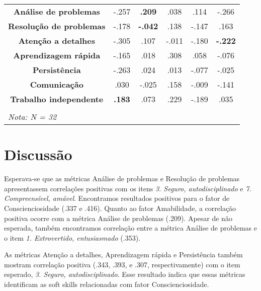 \begin{sidewaystable}[ph!]
\begin{tabular}{lccccc}
		\midrule
    \multicolumn{1}{c}{\textbf{Análise de problemas}} 		& -.257 				 & \textbf{.209}  & .038  & .114  & -.266 				 \\
    \multicolumn{1}{c}{\textbf{Resolução de problemas}} 	& -.178 				 & \textbf{-.042} & .138  & -.147 & .163 				   \\
    \multicolumn{1}{c}{\textbf{Atenção a detalhes}} 			& -.305 				 & .107 				  & -.011 & -.180 & \textbf{-.222} \\
    \multicolumn{1}{c}{\textbf{Aprendizagem rápida}} 			& -.165 				 & .018 				  & .308  & .058  & -.076  				 \\
    \multicolumn{1}{c}{\textbf{Persistência}} 					  & -.263 				 & .024 				  & .013  & -.077 & -.025 				 \\
    \multicolumn{1}{c}{\textbf{Comunicação}} 							& .030 				   & -.025 				  & .158  & -.009 & -.141 				 \\
    \multicolumn{1}{c}{\textbf{Trabalho independente}} 		& \textbf{.183}  & .073 				  & .229  & -.189 & .035 				   \\
    
		\bottomrule
		\multicolumn{1}{l}{\textbf{}} & & & & &  \\
		\multicolumn{1}{l}{\textit{Nota: N = 32}} & & & & &  \\
		
\end{tabular}
\label{tab:tipiss}
\end{sidewaystable}

\section{Discussão}
\label{sec:discussao}

Esperava-se que as métricas Análise de problemas e Resolução de problemas apresentassem correlações positivas com os itens \textit{3. Seguro, autodisciplinado} e \textit{7. Compreensível, amável}. Encontramos resultados positivos para o fator de Conscienciosidade (.337 e .416). Quanto ao fator Amabilidade, a correlação positiva ocorre com a métrica Análise de problemas (.209). Apesar de não esperada, também encontramos correlação entre a métrica Análise de problemas e o item \textit{1. Extrovertido, entusiasmado} (.353).

As métricas Atenção a detalhes, Aprendizagem rápida e Persistência também mostram correlação positiva (.343, .393, e .307, respectivamente) com o item esperado, \textit{3. Seguro, autodisciplinado}. Esse resultado indica que essas métricas identificam as soft skills relacionadas com fator Conscienciosidade.

